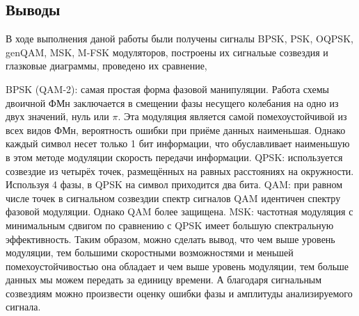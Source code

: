 \documentclass[10pt,a4paper]{article}
\begin{document}
\FloatBarrier
\subsection{Выводы}
В ходе выполнения даной работы были получены сигналы BPSK, PSK, OQPSK, genQAM, MSK, M-FSK модуляторов, построены их сигнальые созвездия и глазковые диаграммы, проведено их сравнение,

BPSK (QAM-2): самая простая форма фазовой манипуляции. 
Работа схемы двоичной ФМн заключается в смещении фазы несущего колебания на одно из двух значений, нуль или $\pi$.  Эта модуляция является самой помехоустойчивой из всех видов ФМн, вероятность ошибки при приёме данных наименьшая. Однако каждый символ несет только 1 бит информации, что обуславливает наименьшую в этом методе модуляции скорость передачи информации.
QPSK: используется созвездие из четырёх точек, размещённых на равных расстояниях на окружности. Используя 4 фазы, в QPSK на символ приходится два бита.
QAM: при равном числе точек в сигнальном созвездии спектр сигналов QAM идентичен спектру фазовой модуляции. Однако QAM более защищена. 
MSK: частотная модуляция с минимальным сдвигом по сравнению с QPSK имеет большую спектральную эффективность.
Таким образом, можно сделать вывод, что чем выше уровень модуляции, тем большими скоростными возможностями и меньшей помехоустойчивостью она обладает и чем выше уровень модуляции, тем больше данных мы можем передать за единицу времени. А благодаря сигнальным созвездиям можно произвести оценку ошибки фазы и амплитуды анализируемого сигнала.
\end{document}
